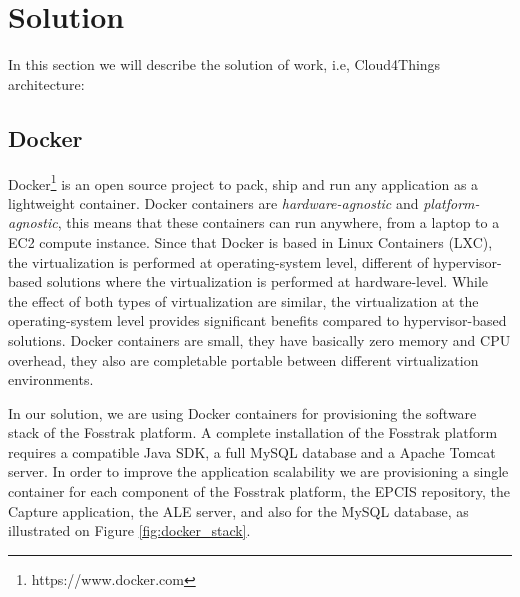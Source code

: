\section{Solution}
\label{sec:solution}
In this section we will describe the solution of work, i.e, Cloud4Things architecture:
\subsection{Docker}
\label{sub:docker}
Docker\footnote{https://www.docker.com} is an open source project to pack, ship and run any application
as a lightweight container. Docker containers are \textit{hardware-agnostic} and \textit{platform-agnostic},
this means that these containers can run anywhere, from a laptop to a EC2 compute instance. Since that Docker
is based in Linux Containers (LXC), the virtualization is performed at operating-system level, different of
hypervisor-based solutions where the virtualization is performed at hardware-level. While the effect of both
types of virtualization are similar, the virtualization at the operating-system level provides significant
benefits compared to hypervisor-based solutions. Docker containers are small, they have basically zero
memory and CPU overhead, they also are completable portable between different virtualization environments.

In our solution, we are using Docker containers for provisioning the software stack of the Fosstrak platform.
A complete installation of the Fosstrak platform requires a compatible Java SDK, a full MySQL database and
a Apache Tomcat server. In order to improve the application scalability we are provisioning a single container 
for each component of the Fosstrak platform, the EPCIS repository, the Capture application, the ALE server,
and also for the MySQL database, as illustrated on Figure \ref{fig:docker_stack}.

